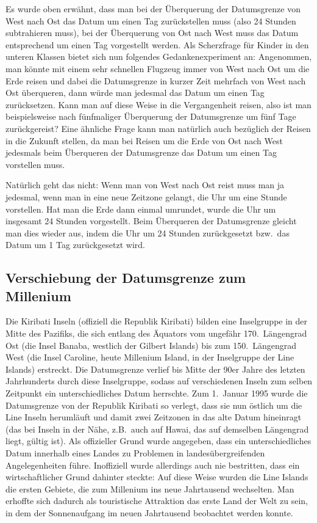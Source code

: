 Es wurde oben erw\"ahnt, 
dass man bei der \"Uberquerung der Datumsgrenze von West nach Ost das Datum
um einen Tag zur\"uckstellen muss (also 24 Stunden subtrahieren muss), bei der \"Uberquerung von Ost nach West
muss das Datum entsprechend um einen Tag vorgestellt werden. Als Scherzfrage f\"ur Kinder in den unteren Klassen
bietet sich nun folgendes Gedankenexperiment an: Angenommen, man k\"onnte mit einem sehr schnellen Flugzeug
immer von West nach Ost um die Erde reisen und dabei die Datumsgrenze in kurzer Zeit mehrfach von West nach
Ost \"uberqueren, dann w\"urde man jedesmal das Datum um einen Tag zur\"ucksetzen. Kann man auf diese Weise
in die Vergangenheit reisen, also ist man beispielsweise nach f\"unfmaliger \"Uberquerung der Datumsgrenze um
f\"unf Tage zur\"uckgereist? Eine \"ahnliche Frage kann man nat\"urlich auch bez\"uglich der Reisen in die
Zukunft stellen, da man bei Reisen um die Erde von Ost nach West jedesmals beim \"Uberqueren der Datumsgrenze
das Datum um einen Tag vorstellen muss. 

Nat\"urlich geht das nicht: Wenn man von West nach Ost reist muss man ja jedesmal, wenn man in eine neue
Zeitzone gelangt, die Uhr um eine Stunde vorstellen. Hat man die Erde dann einmal umrundet, wurde die Uhr um
insgesamt 24 Stunden vorgestellt. Beim \"Uberqueren der Datumsgrenze gleicht man dies wieder aus, indem die
Uhr um 24 Stunden zur\"uckgesetzt bzw.\ das Datum um 1 Tag zur\"uckgesetzt wird. 

\subsection{Verschiebung der Datumsgrenze zum Millenium}

Die Kiribati Inseln 
(offiziell die Republik Kiribati) bilden eine Inselgruppe in der Mitte des Pazifiks, die sich
entlang des \"Aquators vom ungef\"ahr 170.\ L\"angengrad Ost (die Insel Banaba, westlich der Gilbert Islands) 
bis zum 150.\ L\"angengrad West (die Insel Caroline, heute Millenium Island, in der Inselgruppe der Line Islands) 
erstreckt. Die Datumsgrenze verlief bis Mitte der 90er Jahre des letzten Jahrhunderts durch diese Inselgruppe, sodass
auf verschiedenen Inseln zum selben Zeitpunkt ein unterschiedliches Datum herrschte. Zum 1.\ Januar 1995 wurde
die Datumsgrenze von der Republik Kiribati so verlegt, dass sie nun \"ostlich um die Line Inseln heruml\"auft und damit
zwei Zeitzonen in das alte Datum hineinragt (das bei Inseln in der N\"ahe, z.B.\ auch auf Hawai, das
auf demselben L\"angengrad liegt, g\"ultig ist). Als offizieller Grund wurde
angegeben, dass ein unterschiedliches Datum innerhalb eines Landes zu Problemen in landes\"ubergreifenden
Angelegenheiten f\"uhre. Inoffiziell wurde allerdings auch nie bestritten, dass ein wirtschaftlicher Grund dahinter
steckte: Auf diese Weise wurden die Line Islands die ersten Gebiete, die zum Millenium ins neue Jahrtausend
wechselten. Man erhoffte sich dadurch als touristische Attraktion das erste Land der Welt zu sein, in dem der
Sonnenaufgang im neuen Jahrtausend beobachtet werden konnte.   


%

